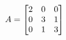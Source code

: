 \documentclass[preview]{standalone}
\begin{document}
\begin{align*}
\special{dvisvgm:raw <g id='unique000'>}               
        A =
        \begin{bmatrix}
        2 & 0 & 0 \\
        0 & 3 & 1 \\
        0 & 1 & 3
        \end{bmatrix}
        \special{dvisvgm:raw </g>}
\end{align*}
\end{document}
